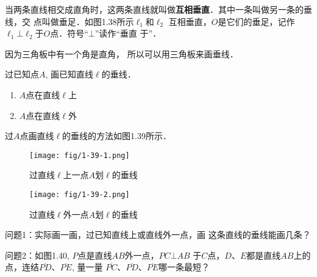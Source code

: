 当两条直线相交成直角时，这两条直线就叫做\textbf{互相垂直}．其中一条叫做另一条的垂线，交
点叫做垂足．如图1.38所示$\ell_1$和$\ell_2$
互相垂直，$O$是它们的垂足，记作
$\ell_1\bot \ell_2$于$O$点．符号“$\bot$”读作“垂直
于”．

\begin{figure}[htp]
	\centering
{}
	\caption{}
\end{figure}


因为三角板中有一个角是直角，
所以可以用三角板来画垂线．

\begin{example}
	过已知点$A$, 画已知直线$\ell$的垂线．
	
\end{example}

\begin{solution}
\begin{enumerate}
	\item $A$点在直线$\ell$上
	\item $A$点在直线$\ell$外
\end{enumerate}
过$A$点画直线$\ell$的垂线的方法如图1.39所示．

\begin{figure}[htp]\centering
	\begin{minipage}[t]{0.48\textwidth}
	\centering
\texttt{[image: fig/1-39-1.png]}
	\caption*{过直线$\ell$上一点$A$划$\ell$的垂线}
	\end{minipage}
	\begin{minipage}[t]{0.48\textwidth}
	\centering
\texttt{[image: fig/1-39-2.png]}
	\caption*{过直线$\ell$外一点$A$划$\ell$的垂线}
	\end{minipage}
	\caption{}
	\end{figure}
\end{solution}

问题1：实际画一画，过已知直线上或直线外一点，画
这条直线的垂线能画几条？

问题2：如图1.40, $P$点是直线$AB$外一点，$PC\bot AB$
于$C$点，$D$、$E$都是直线$AB$上的点，连结$\overline{PD}$、$\overline{PE}$, 量一量
$\overline{PC}$、$\overline{PD}$、$\overline{PE}$哪一条最短？

